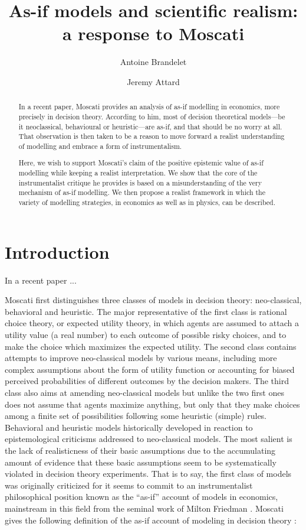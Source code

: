 \documentclass[a4paper,11pt]{article}
\title{As-if models and scientific realism: a response to Moscati}
\date{}
\author[1]{Antoine Brandelet}
\author[1,2]{Jeremy Attard}
\affil[1]{Department of Philosophy and History of Science, University of Mons, Belgium}
\affil[2]{Department of Sciences, Philosophies and Societies, University of Namur, Belgium}
\begin{document}
\maketitle

\begin{abstract}
    In a recent paper, Moscati provides an analysis of as-if modelling in economics, more precisely in decision theory. According to him, most of decision theoretical models---be it neoclassical, behavioural or heuristic---are as-if, and that should be no worry at all. That observation is then taken to be a reason to move forward a realist understanding of modelling and embrace a form of instrumentalism.

    Here, we wish to support Moscati's claim of the positive epistemic value of as-if modelling while keeping a realist interpretation. We show that the core of the instrumentalist critique he provides is based on a misunderstanding of the very mechanism of as-if modelling. We then propose a realist framework in which the variety of modelling strategies, in economics as well as in physics, can be described.
\end{abstract}


\section{Introduction}
In a recent paper \citep{Moscati2023}... 

Moscati first distinguishes three classes of models in decision theory: neo-classical, behavioral and heuristic. The major representative of the first class is rational choice theory, or expected utility theory, in which agents are assumed to attach a utility value (a real number) to each outcome of possible risky choices, and to make the choice which maximizes the expected utility. The second class contains attempts to improve neo-classical models by various means, including more complex assumptions about the form of utility function or accounting for biased perceived probabilities of different outcomes by the decision makers. The third class also aims at amending neo-classical models but unlike the two first ones does not assume that agents maximize anything, but only that they make choices among a finite set of possibilities following some heuristic (simple) rules. Behavioral and heuristic models historically developed in reaction to epistemological criticisms addressed to neo-classical models. The most salient is the lack of realisticness of their basic assumptions due to the accumulating amount of evidence that these basic assumptions seem to be systematically violated in decision theory experiments. That is to say, the first class of models was originally criticized for it seems to commit to an instrumentalist philosophical position known as the ``as-if'' account of models in economics, mainstream in this field from the seminal work of Milton Friedman \cite{Friedman1953}. Moscati gives the following definition of the as-if account of modeling in decision theory \citep[p. 2]{Moscati2023}: 
\end{document}
